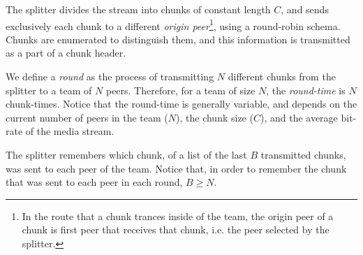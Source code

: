 
\label{sec:feeding_the_team}

The splitter divides the stream into chunks of constant length $C$,
and sends exclusively each chunk to a different \emph{origin
  peer}\footnote{In the route that a chunk trances inside of the team,
  the origin peer of a chunk is first peer that receives that chunk,
  i.e. the peer selected by the splitter.}, using a round-robin
schema. Chunks are enumerated to distinguish them, and this
information is transmitted as a part of a chunk header.

\begin{comment}
More details about the implementation
are available in Fig.~\ref{fig:chunk_generation}.


\begin{figure*}
  \fig{500}{5cm}{DBS_splitter_feed} \caption{Chunk
    generation at the splitter and their transmission to the
    team.\label{fig:chunk_generation}}
\end{figure*}
\end{comment}

We define a \emph{round} as the process of transmitting $N$ different
chunks from the splitter to a team of $N$ peers. Therefore, for a team
of size $N$, the \emph{round-time} is $N$ chunk-times. Notice that the
round-time is generally variable, and depends on the current number of
peers in the team ($N$), the chunk size ($C$), and the average
bit-rate of the media stream.

The splitter remembers which chunk, of a list of the last $B$
transmitted chunks, was sent to each peer of the team. Notice that, in
order to remember the chunk that was sent to each peer in each round, $B\ge
N$. 

\begin{comment}
(in a team) as the time necessary to send two consecutive chunks from
  the splitter (of such team) to the same peer, using the
  round-robing. This time is variable and depends on $|T|$, $C$, and
  the average bit-rate of the media, $A$.
\end{comment}

